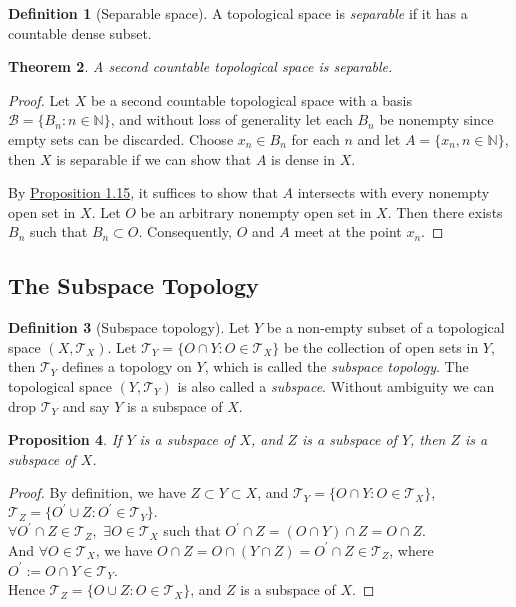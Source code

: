 \documentclass{article}
\numberwithin{equation}{section}
\theoremstyle{plain}
\newtheorem{theorem}{Theorem}[section]
\newtheorem{proposition}[theorem]{Proposition}
\theoremstyle{definition}
\newtheorem{definition}[theorem]{Definition}
\begin{document}
\begin{definition}[Separable space]\label{def:1.20} A topological space is \textit{separable} if it has a countable dense subset.
\end{definition}
\begin{theorem}\label{thm:1.21}
A second countable topological space is separable.
\end{theorem} 
\begin{proof}
Let $X$ be a second countable topological space with a basis $\mathscr{B}=\{B_n:n\in\mathbb{N}\}$, and without loss of generality let each $B_n$ be nonempty since empty sets can be discarded. Choose $x_n\in B_n$ for each $n$ and let $A=\{x_n,n\in\mathbb{N}\}$, then $X$ is separable if we can show that $A$ is dense in $X$. 

By \hyperref[prop:1.15]{Proposition 1.15}, it suffices to show that $A$ intersects with every nonempty open set in $X$. Let $O$ be an arbitrary nonempty open set in $X$. Then there exists $B_n$ such that $B_n\subset O$. Consequently, $O$ and $A$ meet at the point $x_n$.
\end{proof}

\subsection{The Subspace Topology}
\begin{definition}[Subspace topology]\label{def:1.22}
Let $Y$ be a non-empty subset of a topological space $(X,\mathscr{T}_X)$. Let $\mathscr{T}_Y = \{O\cap Y: O\in\mathscr{T}_X\}$ be the collection of open sets in $Y$, then $\mathscr{T}_Y$ defines a topology on $Y$, which is called the \textit{subspace topology}. The topological space $(Y,\mathscr{T}_Y)$ is also called a \textit{subspace}. Without ambiguity we can drop $\mathscr{T}_Y$ and say $Y$ is a subspace of $X$.
\end{definition}

\begin{proposition}\label{prop:1.23} If $Y$ is a subspace of $X$, and $Z$ is a subspace of $Y$, then $Z$ is a subspace of $X$.
\end{proposition}
\begin{proof}
By definition, we have $Z\subset Y\subset X$, and $\mathscr{T}_Y = \{O\cap Y:O\in\mathscr{T}_X\}$, $\mathscr{T}_Z = \{O^\prime\cup Z:O^\prime\in\mathscr{T}_Y\}.$\\
$\forall O^\prime\cap Z\in\mathscr{T}_Z,$ $\exists O\in\mathscr{T}_X$ such that $O^\prime\cap Z = (O\cap Y) \cap Z = O\cap Z.$\\
And $\forall O\in\mathscr{T}_X$, we have $O\cap Z = O\cap (Y\cap Z) = O^\prime\cap Z\in\mathscr{T}_Z$, where $O^\prime:=O\cap Y\in\mathscr{T}_Y$.\\
Hence $\mathscr{T}_Z = \{O\cup Z:O\in\mathscr{T}_X\}$, and $Z$ is a subspace of $X$.
\end{proof}
\end{document}
